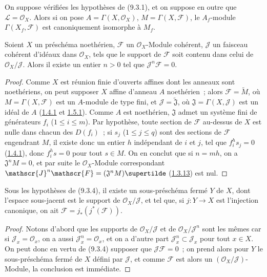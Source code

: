 \begin{corollary}[9.3.3]
\label{I.9.3.3-fr}
On suppose vérifiées les hypothèses de \textup{(9.3.1)}, et on suppose en outre que
$\mathscr{L}=\mathscr{O}_X$. Alors si on pose
$A=\Gamma(X,\mathscr{O}_X)$, $M=\Gamma(X,\mathscr{F})$, le $A_f$-module
$\Gamma(X_f,\mathscr{F})$ est canoniquement isomorphe à $M_f$.
\end{corollary}

\begin{proposition}[9.3.4]
\label{I.9.3.4-fr}
Soient $X$ un préschéma noethérien, $\mathscr{F}$ un
$\mathscr{O}_X$-Module cohérent, $\mathscr{J}$ un faisceau cohérent d'idéaux
dans $\mathscr{O}_X$, tels que le support de $\mathscr{F}$ soit contenu dans
celui de $\mathscr{O}_X/\mathscr{J}$. Alors il existe un entier $n>0$ tel que
$\mathscr{J}^n\mathscr{F}=0$.
\end{proposition}

\begin{proof}
Comme $X$ est réunion finie d'ouverts affines dont les anneaux sont
noethériens, on peut supposer $X$ affine d'anneau $A$ noethérien~; alors
$\mathscr{F}=\widetilde M$, où $M=\Gamma(X,\mathscr{F})$ est un $A$-module
de type fini, et $\mathscr{J}=\widetilde{\mathfrak{J}}$, où
$\mathfrak{J}=\Gamma(X,\mathscr{J})$ est un idéal de $A$
(\hyperref[I.1.4.1-fr]{1.4.1} et \hyperref[I.1.5.1-fr]{1.5.1}). Comme $A$
est noethérien, $\mathfrak{J}$ admet un système fini de générateurs $f_i$
($1\leq i\leq m$). Par hypothèse, toute section de $\mathscr{F}$ au-dessus
de $X$ est nulle dans chacun des $D(f_i)$~; si $s_j$ ($1\leq j\leq q$) sont
des sections de $\mathscr{F}$ engendrant $M$, il existe donc un entier $h$
indépendant de $i$ et $j$, tel que $f_i^h s_j=0$
(\hyperref[I.1.4.1-fr]{1.4.1}), donc $f_i^h s=0$ pour tout $s\in M$. On en
conclut que si $n=mh$, on a $\mathfrak{J}^nM=0$, et par suite le
$\mathscr{O}_X$-Module correspondant
$\mathscr{J}^n\mathscr{F}=(\mathfrak{J}^nM)\supertilde$
(\hyperref[I.1.3.13-fr]{1.3.13}) est nul.
\end{proof}

\begin{corollary}[9.3.5]
\label{I.9.3.5-fr}
Sous les hypothèses de \textup{(9.3.4)}, il existe un sous-préschéma fermé $Y$ de
$X$, dont l'espace sous-jacent est le support de
$\mathscr{O}_X/\mathscr{J}$, et tel que, si $j:Y\to X$ est l'injection
canonique, on ait $\mathscr{F}=j_*(j^*(\mathscr{F}))$.
\end{corollary}

\begin{proof}
Notons d'abord que les supports de $\mathscr{O}_X/\mathscr{J}$ et de
$\mathscr{O}_X/\mathscr{J}^n$ sont les mêmes car si
$\mathscr{J}_x=\mathscr{O}_x$, on a aussi
$\mathscr{J}_x^n=\mathscr{O}_x$, et on a d'autre part
$\mathscr{J}_x^n\subset\mathscr{J}_x$ pour tout $x\in X$. On peut donc en
vertu de (9.3.4) supposer que $\mathscr{J}\mathscr{F}=0$~; on prend alors
pour $Y$ le sous-préschéma fermé de $X$ défini par $\mathscr{J}$, et comme
$\mathscr{F}$ est alors un $(\mathscr{O}_X/\mathscr{J})$-Module, la
conclusion est immédiate.
\end{proof}

